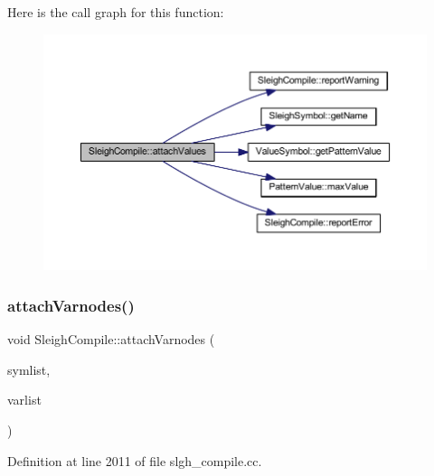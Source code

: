 Here is the call graph for this function\+:
\nopagebreak
\begin{figure}[H]
\begin{center}
\leavevmode
\includegraphics[width=350pt]{class_sleigh_compile_aaa65f4c8bab6da49b695e36808ee6724_cgraph}
\end{center}
\end{figure}
\mbox{\label{class_sleigh_compile_a3bf9c02ba7c649ca151116c181817555}} 
\subsubsection{\texorpdfstring{attachVarnodes()}{attachVarnodes()}}
{\footnotesize\ttfamily void Sleigh\+Compile\+::attach\+Varnodes (\begin{DoxyParamCaption}\item[{vector$<$ \mbox{\hyperlink{class_sleigh_symbol}{Sleigh\+Symbol}} $\ast$ $>$ $\ast$}]{symlist,  }\item[{vector$<$ \mbox{\hyperlink{class_sleigh_symbol}{Sleigh\+Symbol}} $\ast$ $>$ $\ast$}]{varlist }\end{DoxyParamCaption})}



Definition at line 2011 of file slgh\+\_\+compile.\+cc.

